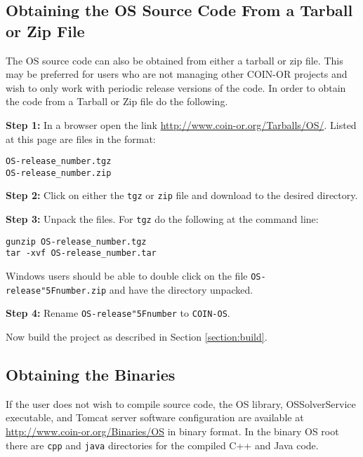 \documentclass[11pt]{article}
\renewcommand{\_}{{\char"5F}}
\renewcommand{\{}{{\char"7B}}
\renewcommand{\}}{{\char"7D}}
\renewcommand{\^}{{\char"0D}}
\renewcommand{\'}{{\char"0D}}
\begin{document}
\subsection{Obtaining the OS Source Code From a Tarball or Zip File}\label{section:getTarBalls}

The OS source code can also be obtained from either a  tarball or zip file.  This may be preferred for users who are not managing other COIN-OR projects and wish to only work with periodic release versions of the code.  In order to obtain the code from a Tarball or Zip file do the following.

\vskip 8pt

{\bf Step 1:} In a browser open the link \url{http://www.coin-or.org/Tarballs/OS/}.  Listed at this page are files in the format:

\begin{verbatim}
OS-release_number.tgz
OS-release_number.zip
\end{verbatim}

\vskip 8pt

{\bf Step 2:} Click on either the {\tt tgz} or {\tt zip} file and download to the desired directory.

\vskip 8pt

{\bf Step 3:} Unpack the files. For {\tt tgz} do the following at the command line:
\begin{verbatim}
gunzip OS-release_number.tgz
tar -xvf OS-release_number.tar
\end{verbatim}

Windows users should be  able to double click on the file {\tt OS-release\_number.zip} and have the directory unpacked.

\vskip 8pt

{\bf Step 4:} Rename {\tt OS-release\_number} to {\tt COIN-OS}.


Now build the project as described in  Section \ref{section:build}.








\subsection{Obtaining the Binaries}\label{section:obtainingbinaries}

If the user does not wish to compile source code, the
OS library, OSSolverService executable, and Tomcat server software configuration are available at \url{http://www.coin-or.org/Binaries/OS} in binary format.  In the binary OS root there  are {\tt cpp} and {\tt java} directories for the compiled C++ and Java code.
\end{document}
